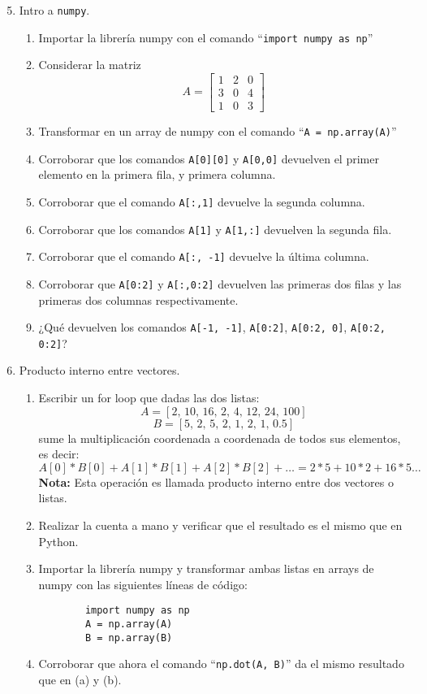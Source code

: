 \documentclass[12pt]{article}
\begin{document}
    \begin{enumerate}
    \setcounter{enumi}{4}
    \item Intro a \texttt{numpy}.
    \begin{enumerate}[label=\alph*)]
        \item Importar la librería numpy con el comando ``\texttt{import numpy as np}''
        \item Considerar la matriz  
        \[
        A = \begin{bmatrix}
        1 & 2 & 0\\[4pt]
        3 & 0 & 4\\[4pt]
        1 & 0 & 3
        \end{bmatrix}
        \]
        \item Transformar en un array de numpy con el comando ``\texttt{A = np.array(A)}''
        \item Corroborar que los comandos \texttt{A[0][0]} y \texttt{A[0,0]} devuelven el primer elemento en la primera fila, y primera columna.
        \item Corroborar que el comando \texttt{A[:,1]} devuelve la segunda columna.
        \item Corroborar que los comandos \texttt{A[1]} y \texttt{A[1,:]} devuelven la segunda fila.
        \item Corroborar que el comando \texttt{A[:, -1]} devuelve la última columna.
        \item Corroborar que \texttt{A[0:2]} y \texttt{A[:,0:2]} devuelven las primeras dos filas y las primeras dos columnas respectivamente.
        \item ¿Qué devuelven los comandos \texttt{A[-1, -1]}, \texttt{A[0:2]}, \texttt{A[0:2, 0]}, \texttt{A[0:2, 0:2]}?
    \end{enumerate}
    
    \item Producto interno entre vectores.
    \begin{enumerate}[label=\alph*)]
        \item Escribir un for loop que dadas las dos listas:
        \[
        A = [2,\, 10,\, 16,\, 2,\, 4,\, 12,\, 24,\, 100]
        \]
        \[
        B = [5,\, 2,\, 5,\, 2,\, 1,\, 2,\, 1,\, 0.5]
        \]
        sume la multiplicación coordenada a coordenada de todos sus elementos, es decir:
        \[
        A[0]*B[0] + A[1]*B[1] + A[2]*B[2] + \dots = 2*5 + 10*2 + 16*5 \dots
        \]
        \textbf{Nota: }Esta operación es llamada producto interno entre dos vectores o listas.
        \item Realizar la cuenta a mano y verificar que el resultado es el mismo que en Python.
        \item Importar la librería numpy y transformar ambas listas en arrays de numpy con las siguientes líneas de código:
        \begin{lstlisting}
        import numpy as np
        A = np.array(A)
        B = np.array(B)
        \end{lstlisting}
        \item Corroborar que ahora el comando ``\texttt{np.dot(A, B)}'' da el mismo resultado que en (a) y (b).
    \end{enumerate}
    

\end{enumerate}
\end{document}
